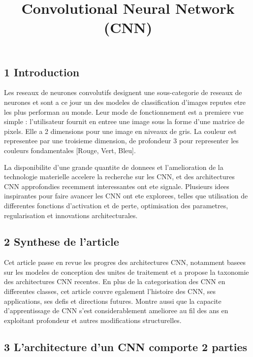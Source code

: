 \documentclass[]{article}
\title{Convolutional Neural Network (CNN)}
\author{}
\date{\vspace{-2.5em}}
\begin{document}
\maketitle

\subsection{1 Introduction}\label{introduction}

Les reseaux de neurones convolutifs designent une sous-categorie de
reseaux de neurones et sont a ce jour un des modeles de classification
d'images reputes etre les plus performan au monde. Leur mode de
fonctionnement est a premiere vue simple : l'utilisateur fournit en
entree une image sous la forme d'une matrice de pixels. Elle a 2
dimensions pour une image en niveaux de gris. La couleur est representee
par une troisieme dimension, de profondeur 3 pour representer les
couleurs fondamentales {[}Rouge, Vert, Bleu{]}.

La disponibilite d'une grande quantite de donnees et l'amelioration de
la technologie materielle accelere la recherche sur les CNN, et des
architectures CNN approfondies recemment interessantes ont ete signale.
Plusieurs idees inspirantes pour faire avancer les CNN ont ete
explorees, telles que utilisation de differentes fonctions d'activation
et de perte, optimisation des parametres, regularisation et innovations
architecturales.

\subsection{2 Synthese de l'article}\label{synthese-de-larticle}

Cet article passe en revue les progres des architectures CNN, notamment
basees sur les modeles de conception des unites de traitement et a
propose la taxonomie des architectures CNN recentes. En plus de la
categorisation des CNN en differentes classes, cet article couvre
egalement l'histoire des CNN, ses applications, ses defis et directions
futures. Montre aussi que la capacite d'apprentissage de CNN s'est
considerablement amelioree au fil des ans en exploitant profondeur et
autres modifications structurelles.

\subsection{3 L'architecture d'un CNN comporte 2
parties}\label{larchitecture-dun-cnn-comporte-2-parties}
\end{document}
